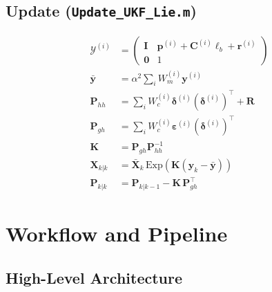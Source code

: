 \documentclass[11pt,a4paper]{article}
\theoremstyle{definition}
\theoremstyle{plain}
\newcommand{\Exp}{\mathrm{Exp}}
\newcommand{\bX}{\mathbf{X}}
\newcommand{\bP}{\mathbf{P}}
\newcommand{\bR}{\mathbf{R}}
\newcommand{\bK}{\mathbf{K}}
\begin{document}
\subsection{Update (\texttt{Update\_UKF\_Lie.m})}

\begin{align}
  \mathcal{Y}^{(i)} &= \begin{pmatrix}\mathbf{I} & \mathbf{p}^{(i)}+\mathbf{C}^{(i)}\bm\ell_b+\mathbf{r}^{(i)}\\\mathbf{0}&1\end{pmatrix} \tag{meas sigma pts}\\
  \bar{\mathbf{y}} &= \alpha^2\sum_i W_m^{(i)}\mathbf{y}^{(i)} \tag{predicted mean}\\
  \mathbf{P}_{hh} &= \sum_i W_c^{(i)}\bm\delta^{(i)}(\bm\delta^{(i)})^\top + \bR \tag{innovation cov}\\
  \mathbf{P}_{gh} &= \sum_i W_c^{(i)}\bm\varepsilon^{(i)}(\bm\delta^{(i)})^\top \tag{cross cov}\\
  \bK &= \mathbf{P}_{gh}\mathbf{P}_{hh}^{-1} \tag{Kalman gain}\\
  \bX_{k|k} &= \bar{\mathbf{X}}_k\,\Exp(\bK(\mathbf{y}_k-\bar{\mathbf{y}})) \tag{state update}\\
  \bP_{k|k} &= \bP_{k|k-1} - \bK\,\mathbf{P}_{gh}^\top \tag{covariance update}
\end{align}

\section{Workflow and Pipeline}

\subsection{High-Level Architecture}
\end{document}
